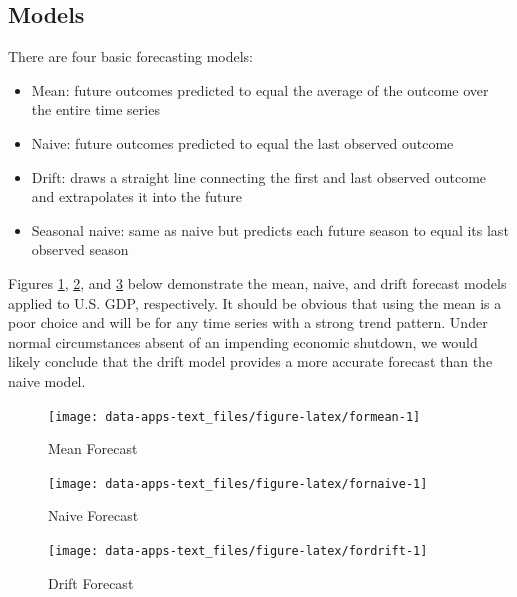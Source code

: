 \documentclass[
]{book}
\providecommand{\tightlist}{%
  \setlength{\itemsep}{0pt}\setlength{\parskip}{0pt}}
\begin{document}
\hypertarget{models}{%
\subsection{Models}\label{models}}

There are four basic forecasting models:

\begin{itemize}
\tightlist
\item
  Mean: future outcomes predicted to equal the average of the outcome over the entire time series
\item
  Naive: future outcomes predicted to equal the last observed outcome
\item
  Drift: draws a straight line connecting the first and last observed outcome and extrapolates it into the future
\item
  Seasonal naive: same as naive but predicts each future season to equal its last observed season
\end{itemize}

Figures \ref{fig:formean}, \ref{fig:fornaive}, and \ref{fig:fordrift} below demonstrate the mean, naive, and drift forecast models applied to U.S. GDP, respectively. It should be obvious that using the mean is a poor choice and will be for any time series with a strong trend pattern. Under normal circumstances absent of an impending economic shutdown, we would likely conclude that the drift model provides a more accurate forecast than the naive model.

\begin{figure}

{\centering \texttt{[image: data-apps-text\_files/figure-latex/formean-1]} 

}

\caption{Mean Forecast}\label{fig:formean}
\end{figure}

\begin{figure}

{\centering \texttt{[image: data-apps-text\_files/figure-latex/fornaive-1]} 

}

\caption{Naive Forecast}\label{fig:fornaive}
\end{figure}

\begin{figure}

{\centering \texttt{[image: data-apps-text\_files/figure-latex/fordrift-1]} 

}

\caption{Drift Forecast}\label{fig:fordrift}
\end{figure}
\end{document}
